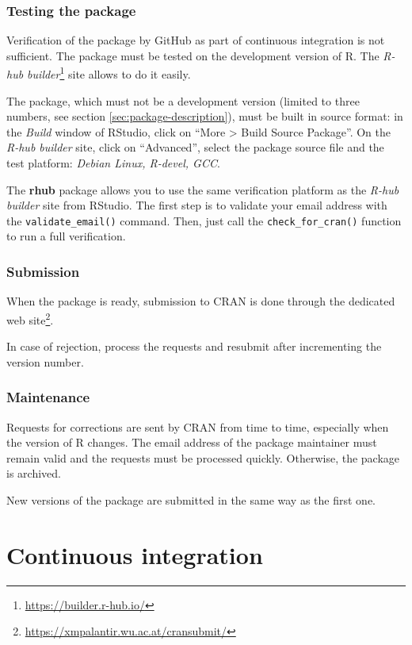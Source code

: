 \documentclass[
  12pt,
  american,
  a4paper,
  extrafontsizes,onecolumn,openright
  ]{memoir}
\begin{document}
\subsection{Testing the package}\label{testing-the-package}

Verification of the package by GitHub as part of continuous integration is not sufficient.
The package must be tested on the development version of R.
The \emph{R-hub builder}\footnote{\url{https://builder.r-hub.io/}} site allows to do it easily.

The package, which must not be a development version (limited to three numbers, see section \ref{sec:package-description}), must be built in source format: in the \emph{Build} window of RStudio, click on \enquote{More \textgreater{} Build Source Package}.
On the \emph{R-hub builder} site, click on \enquote{Advanced}, select the package source file and the test platform: \emph{Debian Linux, R-devel, GCC}.

The \textbf{rhub} package allows you to use the same verification platform as the \emph{R-hub builder} site from RStudio.
The first step is to validate your email address with the \texttt{validate\_email()} command.
Then, just call the \texttt{check\_for\_cran()} function to run a full verification.

\subsection{Submission}\label{submission}

When the package is ready, submission to CRAN is done through the dedicated web site\footnote{\url{https://xmpalantir.wu.ac.at/cransubmit/}}.

In case of rejection, process the requests and resubmit after incrementing the version number.

\subsection{Maintenance}\label{maintenance}

Requests for corrections are sent by CRAN from time to time, especially when the version of R changes.
The email address of the package maintainer must remain valid and the requests must be processed quickly.
Otherwise, the package is archived.

New versions of the package are submitted in the same way as the first one.

\chapter{Continuous integration}\label{chap-ci}
\end{document}
